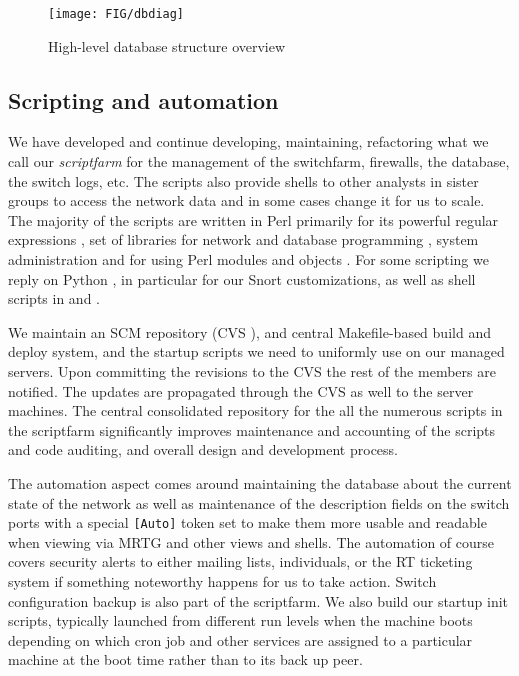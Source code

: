 \begin{figure}[htbp!]
	\centering
	\texttt{[image: FIG/dbdiag]}
	\caption{High-level database structure overview}
	\label{fig:dbdiag}
\end{figure}


\subsection{Scripting and automation}
\label{sect:scripting}

We have developed and continue developing, maintaining, refactoring what we
call our {\em scriptfarm} for the management of the switchfarm, firewalls, the database,
the switch logs, etc. The scripts also provide shells to other analysts
in sister groups to access the network data and in some cases change it
for us to scale. The majority of the scripts are written in Perl primarily
for its powerful regular expressions \cite{perl-regex-97},
set of libraries for network and database programming \cite{network-prog-with-perl-2001},
system administration \cite{perl-sysadmin-2000} and for
using Perl modules and objects \cite{perl-objects-2003}.
For some scripting we reply on Python \cite{core-python-prog-2007},
in particular for our Snort customizations, as well as shell scripts in  and .

We maintain an SCM repository (CVS \cite{cvs}), and central Makefile-based \cite{gmake}
build and deploy system, and the startup scripts we need to uniformly use on
our managed servers. Upon committing the revisions to the CVS the rest of the
members are notified. The updates are propagated through the CVS as well to the
server machines. The central consolidated repository for the all the numerous scripts in the scriptfarm
significantly improves maintenance and accounting of the scripts and code
auditing, and overall design and development process.

The automation aspect comes around maintaining the database about the current
state of the network as well as maintenance of the description fields on the
switch ports with a special \verb+[Auto]+ token set to make them more
usable and readable when viewing via MRTG
\cite{mrtg}
and other views and shells.
The automation of course covers security alerts to either mailing lists, individuals,
or the RT ticketing system if something noteworthy happens for us to take action.
Switch configuration backup is also part of the scriptfarm.
We also build our startup init scripts, typically launched from
different run levels when the machine boots depending on which
cron job and other services are assigned to a particular machine
at the boot time rather than to its back up peer.



